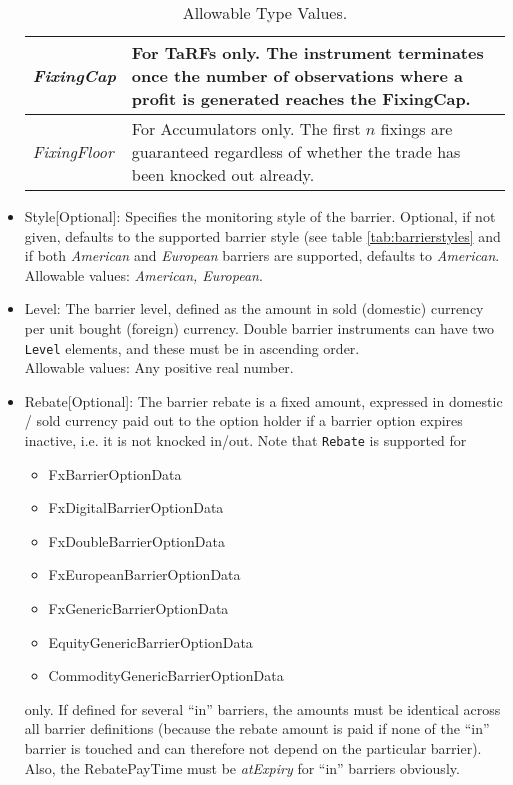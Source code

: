 \begin{itemize}
\begin{table}[H]
\begin{tabular} {|l|p{12cm}|}
 \emph{FixingCap} & For TaRFs only. The instrument terminates once the number of observations where a profit is generated reaches the FixingCap.\\ \hline
 \emph{FixingFloor} & For Accumulators only. The first $n$ fixings are guaranteed regardless of whether the trade has been knocked out already.\\ \hline
  \end{tabular}
  \caption{Allowable Type Values.}
  \label{tab:barriertype}
\end{table}

\item Style[Optional]: Specifies the monitoring style of the barrier. Optional, if not given, defaults to the supported barrier
  style (see table \ref{tab:barrierstyles} and if both \emph{American} and \emph{European} barriers are supported, defaults to
  \emph{American}. \\

Allowable values: \emph{American, European}.

\item Level: The barrier level, defined as the amount in sold (domestic) currency per unit bought (foreign) currency. Double barrier instruments can have two \lstinline!Level! elements, and these must be in ascending order. \\

Allowable values:  Any positive real number.

\item Rebate[Optional]: The barrier rebate is a fixed amount, expressed in domestic / sold currency paid out to the
  option holder if a barrier option expires inactive, i.e. it is not knocked in/out.   Note that \lstinline!Rebate! is
  supported for

\begin{itemize}
  \item FxBarrierOptionData
  \item FxDigitalBarrierOptionData
  \item FxDoubleBarrierOptionData
  \item FxEuropeanBarrierOptionData
  \item FxGenericBarrierOptionData
  \item EquityGenericBarrierOptionData
  \item CommodityGenericBarrierOptionData
\end{itemize}

 only. If defined for several ``in'' barriers, the amounts must be identical across all barrier definitions (because the
 rebate amount is paid if none of the ``in'' barrier is touched and can therefore not depend on the particular
 barrier). Also, the RebatePayTime must be \emph{atExpiry} for ``in'' barriers obviously. \\


\end{itemize}
